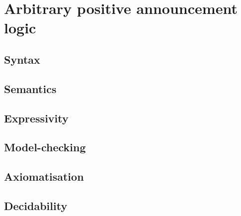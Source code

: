 \chapter{Arbitrary positive announcement logic}

\section{Syntax}

\section{Semantics}

\section{Expressivity}

\section{Model-checking}

\section{Axiomatisation}

\section{Decidability}
